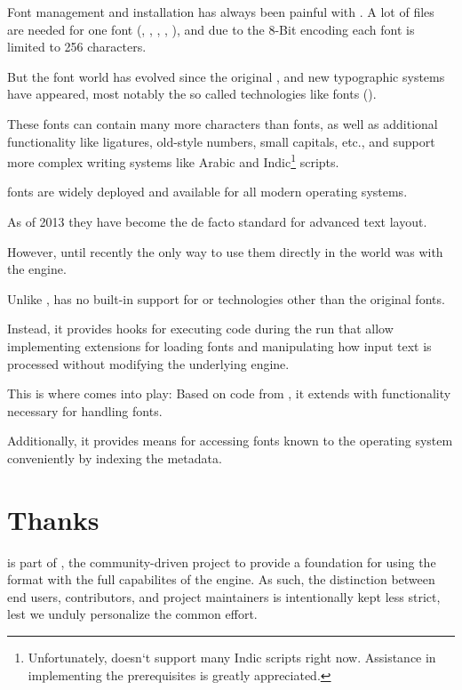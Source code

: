 Font management and installation has always been painful with \TEX.  A
lot of files are needed for one font (, ,
, , ), and due to the 8-Bit encoding
each font is limited to 256 characters.

But the font world has evolved since the original \TEX, and new
typographic systems have appeared, most notably the so called
 technologies like \OpenType fonts ().

These fonts can contain many more characters than \TEX fonts, as well
as additional functionality like ligatures, old-style numbers, small
capitals, etc., and support more complex writing systems like Arabic
and Indic\footnote{%
	Unfortunately,  doesn‘t support many Indic
	scripts right now.
	Assistance in implementing the prerequisites is greatly
	appreciated.
}
scripts.

\OpenType fonts are widely deployed and available for all modern
operating systems.

As of 2013 they have become the de facto standard for advanced text
layout.

However, until recently the only way to use them directly in the \TEX
world was with the \XETEX engine.

Unlike \XETEX, \LUATEX has no built-in support for \OpenType or
technologies other than the original \TEX fonts.

Instead, it provides hooks for executing \LUA code during the \TEX run
that allow implementing extensions for loading fonts and manipulating
how input text is processed without modifying the underlying engine.

This is where  comes into play:
Based on code from \CONTEXT, it extends \LUATEX with functionality necessary
for handling \OpenType fonts.

Additionally, it provides means for accessing fonts known to the operating
system conveniently by indexing the metadata.

\section{Thanks}

 is part of \LUALATEX, the community-driven
project to provide a foundation for using the \LATEX format with the
full capabilites of the \LUATEX engine.
%
As such, the distinction between end users, contributors, and project
maintainers is intentionally kept less strict, lest we unduly
personalize the common effort.

